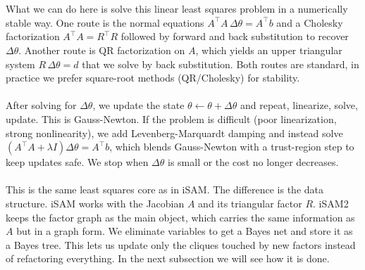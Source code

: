 \\ \\
What we can do here is solve this linear least squares problem in a numerically stable way. One route is the normal equations $A^\top A\,\Delta\theta = A^\top b$ and a Cholesky factorization $A^\top A = R^\top R$ followed by forward and back substitution to recover $\Delta\theta$. Another route is QR factorization on $A$, which yields an upper triangular system $R\,\Delta\theta = d$ that we solve by back substitution. Both routes are standard, in practice we prefer square-root methods (QR/Cholesky) for stability.
\\ \\
After solving for $\Delta\theta$, we update the state $\theta \leftarrow \theta + \Delta\theta$ and repeat, linearize, solve, update. This is Gauss-Newton. If the problem is difficult (poor linearization, strong nonlinearity), we add Levenberg-Marquardt damping and instead solve $(A^\top A + \lambda I)\Delta\theta = A^\top b$, which blends Gauss-Newton with a trust-region step to keep updates safe. We stop when $\Delta\theta$ is small or the cost no longer decreases.
\\ \\
This is the same least squares core as in \gls{iSAM}. The difference is the data structure. \gls{iSAM} works with the Jacobian $A$ and its triangular factor $R$. \gls{iSAM}2 keeps the factor graph as the main object, which carries the same information as $A$ but in a graph form. We eliminate variables to get a Bayes net and store it as a Bayes tree. This lets us update only the cliques touched by new factors instead of refactoring everything. In the next subsection we will see how it is done.



